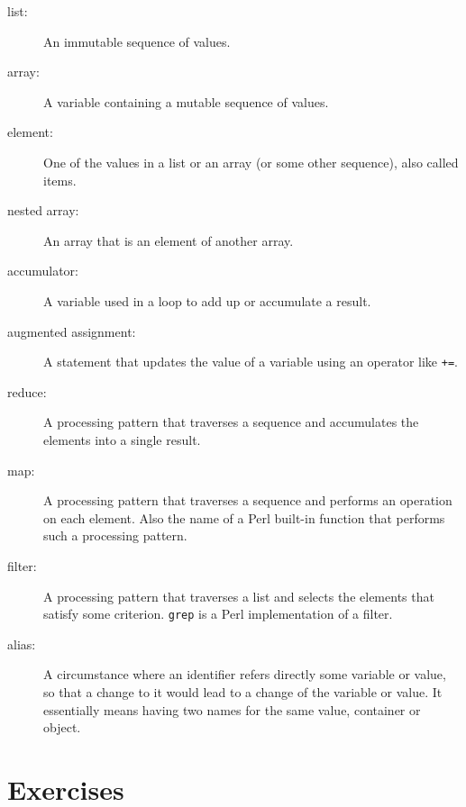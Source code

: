\begin{description}

\item[list:] An immutable sequence of values.

\item[array:] A variable containing a mutable sequence 
of values.

\item[element:] One of the values in a list or an 
array (or some other sequence), also called items.

\item[nested array:] An array that is an element of another array.

\item[accumulator:] A variable used in a loop to add up or
accumulate a result.

\item[augmented assignment:] A statement that updates the value
of a variable using an operator like \verb"+=".

\item[reduce:] A processing pattern that traverses a sequence 
and accumulates the elements into a single result.

\item[map:] A processing pattern that traverses a 
sequence and performs an operation on each element. 
Also the name of a Perl built-in function that performs 
such a processing pattern.

\item[filter:] A processing pattern that traverses a 
list and selects the elements that satisfy some criterion. 
{\tt grep} is a Perl implementation of a filter.

\item[alias:] A circumstance where an identifier refers 
directly some variable or value, so that 
a change to it would lead to a change of 
the variable or value. It essentially means having 
two names for the same value, container or object.

\end{description}


\section{Exercises}
\label{array_exercises}


